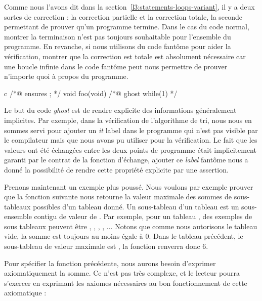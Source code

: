 Comme nous l'avons dit dans la section~\ref{l3:statements-loops-variant}, il y
a deux sortes de correction : la correction partielle et la correction totale,
la seconde permettant de prouver qu'un programme termine. Dans le cas du code
normal, montrer la terminaison n'est pas toujours souhaitable pour l'ensemble
du programme. En revanche, si nous utilisons du code fantôme pour aider la
vérification, montrer que la correction est totale est absolument nécessaire
car une boucle infinie dans le code fantôme peut nous permettre de prouver
n'importe quoi à propos du programme.


\begin{CodeBlock}{c}
/*@ ensures \false ; */
void foo(void){
  /*@ ghost
    while(1){}
  */
}
\end{CodeBlock}




Le but du code \textit{ghost} est de rendre explicite des informations généralement
implicites. Par exemple, dans la vérification de l'algorithme de tri, nous nous en
sommes servi pour ajouter un \textit{it} label dans le programme qui n'est pas
visible par le compilateur mais que nous avons pu utiliser pour la vérification.
Le fait que les valeurs ont été échangées entre les deux points de programme était
implicitement garanti par le contrat de la fonction d'échange, ajouter ce
\textit{label} fantôme nous a donné la possibilité de rendre cette propriété
explicite par une assertion.



Prenons maintenant un exemple plus poussé. Nous voulons par exemple prouver que
la fonction suivante nous retourne la valeur maximale des sommes de sous-tableaux
possibles d'un tableau donné. Un sous-tableau d'un tableau  est un
sous-ensemble contigu de valeur de . Par exemple, pour un tableau
, des exemples de sous tableaux peuvent être
\CodeInline{\{\}}, , ,
, ... Notons que comme nous autorisons le
tableau vide, la somme est toujours au moins égale à 0. Dans le tableau précédent,
le sous-tableau de valeur maximale est , la fonction
renverra donc 6.






Pour spécifier la fonction précédente, nous aurons besoin d'exprimer
axiomatiquement la somme. Ce n'est pas très complexe, et le lecteur pourra
s'exercer en exprimant les axiomes nécessaires au bon fonctionnement de cette
axiomatique :



